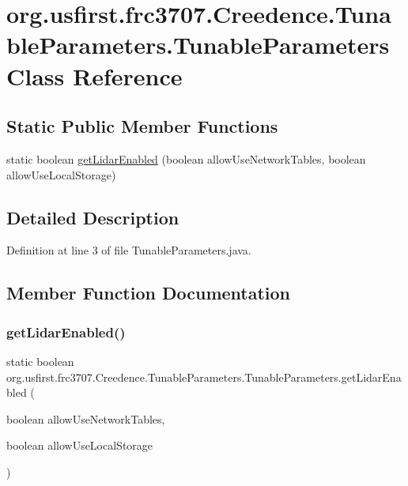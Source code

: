 \hypertarget{classorg_1_1usfirst_1_1frc3707_1_1_creedence_1_1_tunable_parameters_1_1_tunable_parameters}{}\section{org.\+usfirst.\+frc3707.\+Creedence.\+Tunable\+Parameters.\+Tunable\+Parameters Class Reference}
\label{classorg_1_1usfirst_1_1frc3707_1_1_creedence_1_1_tunable_parameters_1_1_tunable_parameters}
\subsection*{Static Public Member Functions}
\begin{DoxyCompactItemize}
\item 
static boolean \mbox{\hyperlink{classorg_1_1usfirst_1_1frc3707_1_1_creedence_1_1_tunable_parameters_1_1_tunable_parameters_ae73a100a37b662ff6925cac552bc9133}{get\+Lidar\+Enabled}} (boolean allow\+Use\+Network\+Tables, boolean allow\+Use\+Local\+Storage)
\end{DoxyCompactItemize}


\subsection{Detailed Description}


Definition at line 3 of file Tunable\+Parameters.\+java.



\subsection{Member Function Documentation}
\mbox{\label{classorg_1_1usfirst_1_1frc3707_1_1_creedence_1_1_tunable_parameters_1_1_tunable_parameters_ae73a100a37b662ff6925cac552bc9133}} 
\subsubsection{\texorpdfstring{getLidarEnabled()}{getLidarEnabled()}}
{\footnotesize\ttfamily static boolean org.\+usfirst.\+frc3707.\+Creedence.\+Tunable\+Parameters.\+Tunable\+Parameters.\+get\+Lidar\+Enabled (\begin{DoxyParamCaption}\item[{boolean}]{allow\+Use\+Network\+Tables,  }\item[{boolean}]{allow\+Use\+Local\+Storage }\end{DoxyParamCaption})\hspace{0.3cm}{\ttfamily [static]}}

